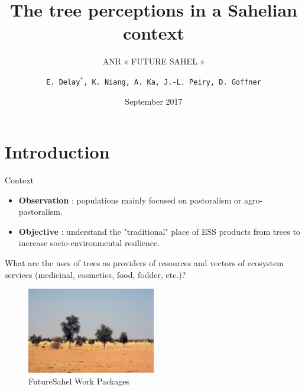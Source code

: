 \documentclass[newPxFont]{beamer}
\title{The tree perceptions in a Sahelian context}
\subtitle{ANR « FUTURE SAHEL »}
\date{September 2017}
\author{\texttt{E. Delay$^*$,  K. Niang, A. Ka, J.-L. Peiry, D. Goffner}}
\institute{Presentation at Stockholm Resilience Center}
\begin{document}
%
%

\maketitle


%
%


\section{Introduction}

\begin{frame}[c]{Context}
\vspace{-1cm}
\begin{itemize}
  \item \textbf{Observation} : populations mainly focused on pastoralism or agro-pastoralism.
  \item \textbf{Objective} : understand the "traditional" place of ESS products from trees to increase socio-environmental resilience.
\end{itemize}

What are the uses of trees as providers of resources and vectors of ecosystem services (medicinal, cosmetics, food, fodder, etc.)?

\begin{figure}
	\centering
	\includegraphics[width = 0.5\textwidth]{img/2007_Podor.JPG}
	\caption{FutureSahel Work Packages}
\end{figure}
\end{frame}
\end{document}
